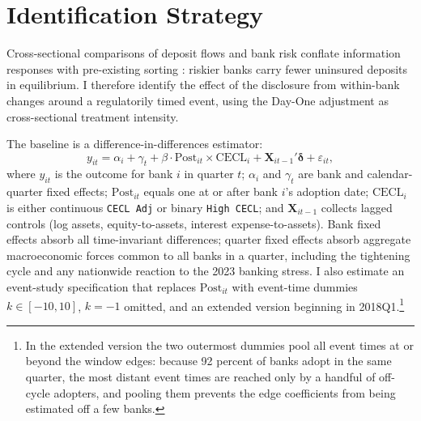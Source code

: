 \section{Identification Strategy}
\label{sec:identification}

Cross-sectional comparisons of deposit flows and bank risk conflate
information responses with pre-existing sorting
\citep{covitz2004market, chen2022bank}: riskier banks carry fewer
uninsured deposits in equilibrium.  I therefore identify the effect of
the disclosure from within-bank changes around a regulatorily timed
event, using the Day-One adjustment as cross-sectional treatment
intensity.

The baseline is a difference-in-differences estimator:
\begin{equation}
  y_{it}
  = \alpha_i + \gamma_t
  + \beta \cdot \mathrm{Post}_{it} \times \mathrm{CECL}_i
  + \mathbf{X}_{it-1}'\boldsymbol{\delta}
  + \varepsilon_{it},
  \label{eq:did}
\end{equation}
where $y_{it}$ is the outcome for bank $i$ in quarter $t$; $\alpha_i$
and $\gamma_t$ are bank and calendar-quarter fixed effects;
$\mathrm{Post}_{it}$ equals one at or after bank $i$'s adoption date;
$\mathrm{CECL}_i$ is either continuous \texttt{CECL Adj} or binary
\texttt{High CECL}; and $\mathbf{X}_{it-1}$ collects lagged controls
(log assets, equity-to-assets, interest expense-to-assets).  Bank fixed
effects absorb all time-invariant differences; quarter fixed effects
absorb aggregate macroeconomic forces common to all banks in a quarter,
including the tightening cycle and any nationwide reaction to the 2023
banking stress.  I also estimate an event-study specification that
replaces $\mathrm{Post}_{it}$ with event-time dummies
$k\in[-10,10]$, $k=-1$ omitted, and an extended version beginning in
2018Q1.\footnote{In the extended version the two outermost dummies
pool all event times at or beyond the window edges: because 92 percent
of banks adopt in the same quarter, the most distant event times are
reached only by a handful of off-cycle adopters, and pooling them
prevents the edge coefficients from being estimated off a few banks.}

